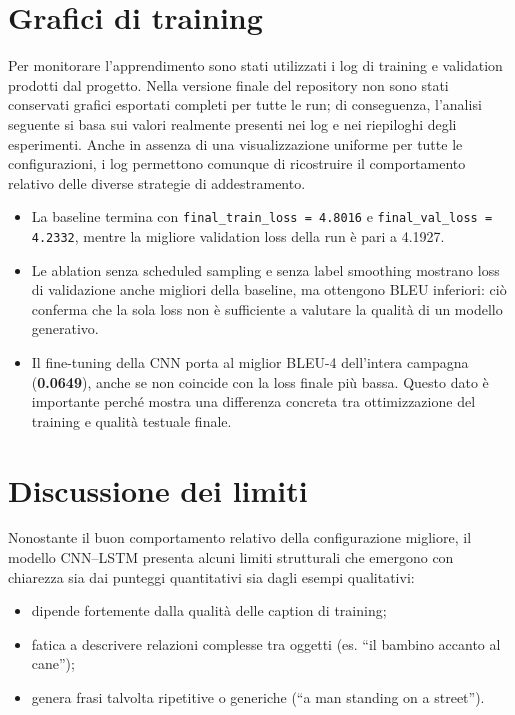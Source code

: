 \documentclass[11pt,a4paper]{report}
\begin{document}
\section{Grafici di training}

Per monitorare l’apprendimento sono stati utilizzati i log di training e validation prodotti dal progetto. Nella versione finale del repository non sono stati conservati grafici esportati completi per tutte le run; di conseguenza, l’analisi seguente si basa sui valori realmente presenti nei log e nei riepiloghi degli esperimenti. Anche in assenza di una visualizzazione uniforme per tutte le configurazioni, i log permettono comunque di ricostruire il comportamento relativo delle diverse strategie di addestramento.

\begin{tcolorbox}[title=Interpretazione dei grafici]
\begin{itemize}
  \item La baseline termina con \texttt{final\_train\_loss = 4.8016} e \texttt{final\_val\_loss = 4.2332}, mentre la migliore validation loss della run è pari a 4.1927.
  \item Le ablation senza scheduled sampling e senza label smoothing mostrano loss di validazione anche migliori della baseline, ma ottengono BLEU inferiori: ciò conferma che la sola loss non è sufficiente a valutare la qualità di un modello generativo.
  \item Il fine-tuning della CNN porta al miglior BLEU-4 dell'intera campagna (\textbf{0.0649}), anche se non coincide con la loss finale più bassa. Questo dato è importante perché mostra una differenza concreta tra ottimizzazione del training e qualità testuale finale.
\end{itemize}
\end{tcolorbox}

\section{Discussione dei limiti}

Nonostante il buon comportamento relativo della configurazione migliore, il modello CNN–LSTM presenta alcuni limiti strutturali che emergono con chiarezza sia dai punteggi quantitativi sia dagli esempi qualitativi:
\begin{itemize}
  \item dipende fortemente dalla qualità delle caption di training;
  \item fatica a descrivere relazioni complesse tra oggetti (es. “il bambino accanto al cane”);
  \item genera frasi talvolta ripetitive o generiche (“a man standing on a street”).
\end{itemize}
\end{document}
